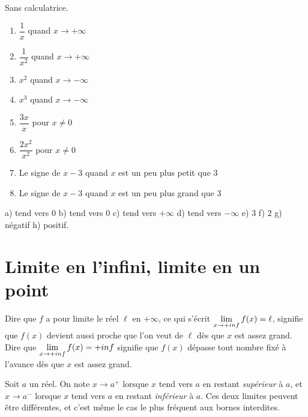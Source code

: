 \begin{automatismes}
Sans calculatrice.

\begin{enumerate}[label=\textbf{\alph*)}, leftmargin=*, itemsep=0.25em]
  \item $\dfrac{1}{x}$ quand $x \to +\infty$
  \item $\dfrac{1}{x^{2}}$ quand $x \to +\infty$
  \item $x^{2}$ quand $x \to -\infty$
  \item $x^{3}$ quand $x \to -\infty$
  \item $\dfrac{3x}{x}$ pour $x \neq 0$
  \item $\dfrac{2x^{2}}{x^{2}}$ pour $x \neq 0$
  \item Le signe de $x-3$ quand $x$ est un peu plus petit que $3$
  \item Le signe de $x-3$ quand $x$ est un peu plus grand que $3$
\end{enumerate}
\end{automatismes}

\begin{corrige}[automatismes]
a) tend vers $0$ \quad b) tend vers $0$ \quad c) tend vers $+\infty$ \quad
d) tend vers $-\infty$ \quad e) $3$ \quad f) $2$ \quad g) négatif \quad
h) positif.
\end{corrige}

\section{Limite en l'infini, limite en un point}

\begin{definition}
Dire que $f$ a pour limite le réel $\ell$ en $+\infty$, ce qui s'écrit
$\limpinf f(x) = \ell$, signifie que $f(x)$ devient aussi proche que l'on
veut de $\ell$ dès que $x$ est assez grand. Dire que
$\limpinf f(x) = +\infty$ signifie que $f(x)$ dépasse tout nombre fixé à
l'avance dès que $x$ est assez grand.
\end{definition}

\begin{definition}
Soit $a$ un réel. On note $x \to a^{+}$ lorsque $x$ tend vers $a$ en restant
\emph{supérieur} à $a$, et $x \to a^{-}$ lorsque $x$ tend vers $a$ en restant
\emph{inférieur} à $a$. Ces deux limites peuvent être différentes, et c'est
même le cas le plus fréquent aux bornes interdites.
\end{definition}

